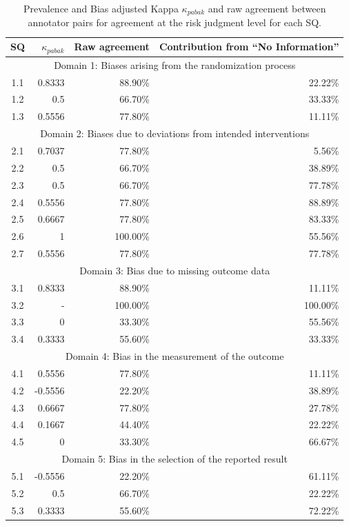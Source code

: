 \documentclass[sn-mathphys,Numbered]{sn-jnl}%
\theoremstyle{thmstyleone}%
\theoremstyle{thmstyletwo}%
\theoremstyle{thmstylethree}%
\begin{document}
%
%
%
\begin{table}[]
    \caption{Prevalence and Bias adjusted Kappa $\kappa_{pabak}$ and raw agreement between annotator pairs for agreement at the risk judgment level for each SQ.}
    \label{tab:IAA_response}
    \begin{tabular}{crrr}
    \toprule[1.0pt]
        SQ & $\kappa_{pabak}$ & Raw agreement & Contribution from ``No Information'' \\
    \midrule[1.0pt]
        \multicolumn{4}{c}{Domain 1: Biases arising from the randomization process} \\
        \hline
        1.1 & 0.8333 & 88.90\% & 22.22\% \\
        1.2 & 0.5 & 66.70\% & 33.33\% \\
        1.3 & 0.5556 & 77.80\% & 11.11\% \\
        \hline 
        \multicolumn{4}{c}{Domain 2: Biases due to deviations from intended interventions} \\
        \hline
        2.1 & 0.7037 & 77.80\% & 5.56\% \\
        2.2 & 0.5 & 66.70\% & 38.89\% \\
        2.3 & 0.5 & 66.70\% & 77.78\% \\
        2.4 & 0.5556 & 77.80\% & 88.89\% \\
        2.5 & 0.6667 & 77.80\% & 83.33\% \\
        2.6 & 1 & 100.00\% & 55.56\% \\
        2.7 & 0.5556 & 77.80\% & 77.78\% \\
        \hline
        \multicolumn{4}{c}{Domain 3: Bias due to missing outcome data} \\
        \hline
        3.1 & 0.8333 & 88.90\% & 11.11\% \\
        3.2 & - & 100.00\% & 100.00\% \\
        3.3 & 0 & 33.30\% & 55.56\% \\
        3.4 & 0.3333 & 55.60\% & 33.33\% \\
        \hline
        \multicolumn{4}{c}{Domain 4: Bias in the measurement of the outcome} \\
        \hline
        4.1 & 0.5556 & 77.80\% & 11.11\% \\
        4.2 & -0.5556 & 22.20\% & 38.89\% \\
        4.3 & 0.6667 & 77.80\% & 27.78\% \\
        4.4 & 0.1667 & 44.40\% & 22.22\% \\
        4.5 & 0 & 33.30\% & 66.67\% \\
        \hline
        \multicolumn{4}{c}{Domain 5: Bias in the selection of the reported result} \\
        \hline
        5.1 & -0.5556 & 22.20\% & 61.11\% \\
        5.2 & 0.5 & 66.70\% & 22.22\% \\
        5.3 & 0.3333 & 55.60\% & 72.22\% \\
    \bottomrule[1.0pt]
    \end{tabular}
\end{table}
\end{document}
